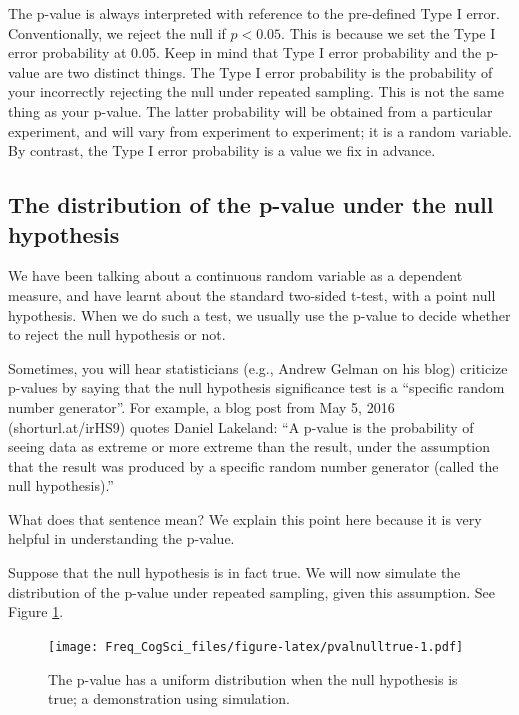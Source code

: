 \documentclass[
  12pt,
]{krantz}
\theoremstyle{definition}
\theoremstyle{definition}
\theoremstyle{definition}
\theoremstyle{definition}
\theoremstyle{remark}
\begin{document}
The p-value is always interpreted with reference to the pre-defined Type I error. Conventionally, we reject the null if \(p<0.05\). This is because we set the Type I error probability at 0.05. Keep in mind that Type I error probability and the p-value are two distinct things.
The Type I error probability is the probability of your incorrectly rejecting the null under repeated sampling. This is not the same thing as your p-value. The latter probability will be obtained from a particular experiment, and will vary from experiment to experiment; it is a random variable. By contrast, the Type I error probability is a value we fix in advance.

\hypertarget{the-distribution-of-the-p-value-under-the-null-hypothesis}{%
\subsection{The distribution of the p-value under the null hypothesis}\label{the-distribution-of-the-p-value-under-the-null-hypothesis}}

We have been talking about a continuous random variable as a dependent measure, and have learnt about the standard two-sided t-test, with a point null hypothesis. When we do such a test, we usually use the p-value to decide whether to reject the null hypothesis or not.

Sometimes, you will hear statisticians (e.g., Andrew Gelman on his blog) criticize p-values by saying that the null hypothesis significance test is a ``specific random number generator''. For example, a blog post from May 5, 2016 (shorturl.at/irHS9) quotes Daniel Lakeland: ``A p-value is the probability of seeing data as extreme or more extreme than the result, under the assumption that the result was produced by a specific random number generator (called the null hypothesis).''

What does that sentence mean? We explain this point here because it is very helpful in understanding the p-value.

Suppose that the null hypothesis is in fact true. We will now simulate the distribution of the p-value under repeated sampling, given this assumption. See Figure \ref{fig:pvalnulltrue}.

\begin{figure}
\centering
\texttt{[image: Freq\_CogSci\_files/figure-latex/pvalnulltrue-1.pdf]}
\caption{\label{fig:pvalnulltrue}The p-value has a uniform distribution when the null hypothesis is true; a demonstration using simulation.}
\end{figure}
\end{document}
